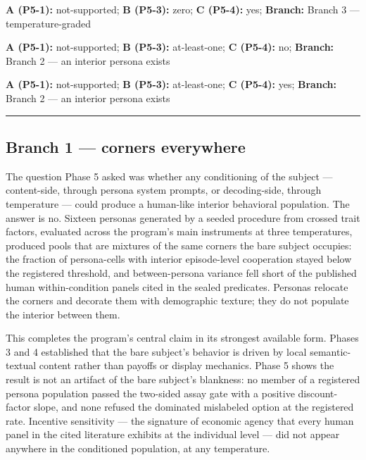 \documentclass[11pt]{article}
\begin{document}
\textbf{A (P5-1):} not-supported; \textbf{B (P5-3):} zero; \textbf{C
(P5-4):} yes; \textbf{Branch:} Branch 3 --- temperature-graded

\textbf{A (P5-1):} not-supported; \textbf{B (P5-3):} at-least-one;
\textbf{C (P5-4):} no; \textbf{Branch:} Branch 2 --- an interior persona
exists

\textbf{A (P5-1):} not-supported; \textbf{B (P5-3):} at-least-one;
\textbf{C (P5-4):} yes; \textbf{Branch:} Branch 2 --- an interior
persona exists

\begin{center}\rule{0.5\linewidth}{0.5pt}\end{center}

\subsection{Branch 1 --- corners
everywhere}\label{branch-1-corners-everywhere}

The question Phase 5 asked was whether any conditioning of the subject
--- content-side, through persona system prompts, or decoding-side,
through temperature --- could produce a human-like interior behavioral
population. The answer is no. Sixteen personas generated by a seeded
procedure from crossed trait factors, evaluated across the program's
main instruments at three temperatures, produced pools that are mixtures
of the same corners the bare subject occupies: the fraction of
persona-cells with interior episode-level cooperation stayed below the
registered threshold, and between-persona variance fell short of the
published human within-condition panels cited in the sealed predicates.
Personas relocate the corners and decorate them with demographic
texture; they do not populate the interior between them.

This completes the program's central claim in its strongest available
form. Phases 3 and 4 established that the bare subject's behavior is
driven by local semantic-textual content rather than payoffs or display
mechanics. Phase 5 shows the result is not an artifact of the bare
subject's blankness: no member of a registered persona population passed
the two-sided assay gate with a positive discount-factor slope, and none
refused the dominated mislabeled option at the registered rate.
Incentive sensitivity --- the signature of economic agency that every
human panel in the cited literature exhibits at the individual level ---
did not appear anywhere in the conditioned population, at any
temperature.
\end{document}
